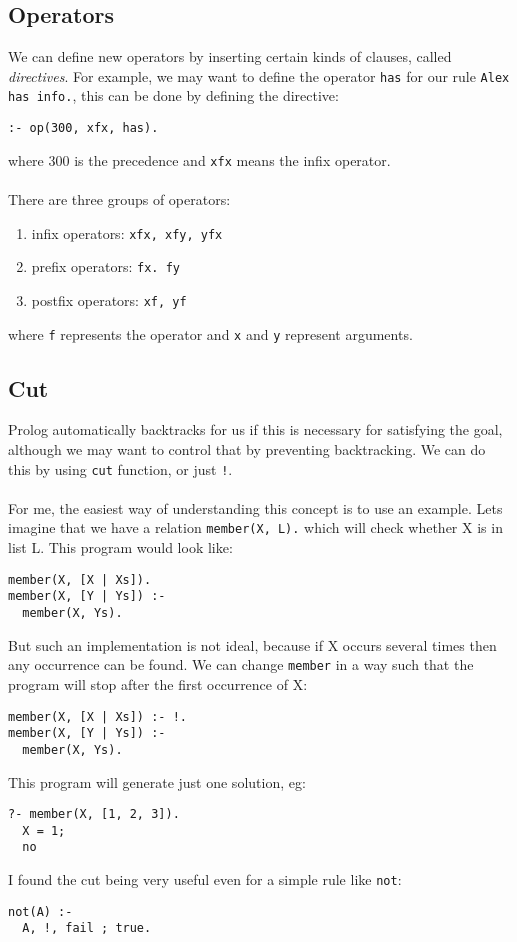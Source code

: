 \documentclass[11pt]{article}
\begin{document}
\subsection{Operators}
We can define new operators by inserting certain kinds of clauses, called \emph{directives}. For example, we may want to define the operator \texttt{has} for our rule \texttt{Alex has info.},
this can be done by defining the directive:
\begin{lstlisting}
:- op(300, xfx, has).
\end{lstlisting}
where 300 is the precedence and \texttt{xfx} means the infix operator.\\\\
There are three groups of operators:
\begin{enumerate}
\item infix operators: \texttt{xfx, xfy, yfx}
\item prefix operators: \texttt{fx. fy}
\item postfix operators: \texttt{xf, yf}
\end{enumerate}
where \texttt{f} represents the operator and \texttt{x} and \texttt{y} represent arguments.

\subsection{Cut}
Prolog automatically backtracks for us if this is necessary for satisfying the goal, although we may want to control that by preventing backtracking. We can do this by using \texttt{cut} function, or just \texttt{!}.\\\\
For me, the easiest way of understanding this concept is to use an example. Lets imagine that we have a relation \texttt{member(X, L).} which will check whether X is in list L. This program would look like:
\begin{lstlisting}
member(X, [X | Xs]).
member(X, [Y | Ys]) :-
  member(X, Ys).
\end{lstlisting}
But such an implementation is not ideal, because if X occurs several times then any occurrence can be found. We can change \texttt{member} in a way such that the program will stop after the first occurrence of X:
\begin{lstlisting}
member(X, [X | Xs]) :- !.
member(X, [Y | Ys]) :-
  member(X, Ys).
\end{lstlisting}
This program will generate just one solution, eg:
\begin{lstlisting}
?- member(X, [1, 2, 3]).
  X = 1;
  no
\end{lstlisting}
I found the cut being very useful even for a simple rule like \texttt{not}:
\begin{lstlisting}
not(A) :-
  A, !, fail ; true.
\end{lstlisting}
\end{document}
